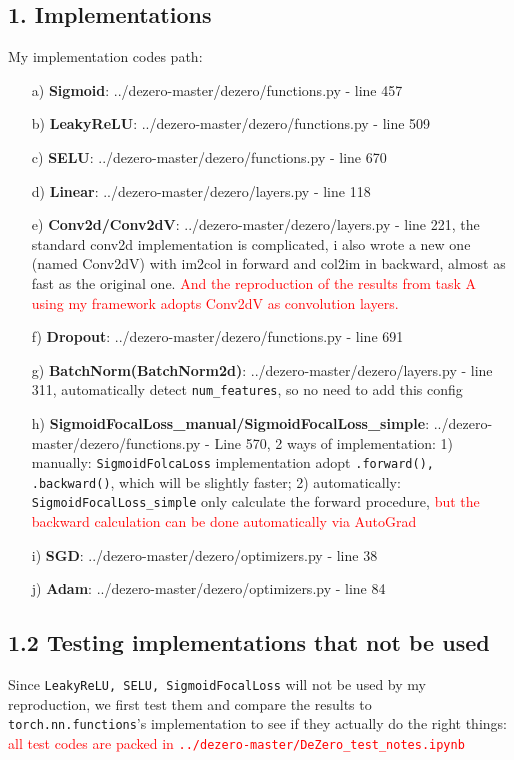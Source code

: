 \documentclass{article}
\newcommand{\subs}[1]{\subsection*{#1}}
\begin{document}
\subs{1. Implementations}
\noindent My implementation codes path:\\
\begin{itemize}
  \item[a)] \textbf{Sigmoid}: ../dezero-master/dezero/functions.py - line 457
  \item[b)] \textbf{LeakyReLU}: ../dezero-master/dezero/functions.py - line 509
  \item[c)] \textbf{SELU}: ../dezero-master/dezero/functions.py - line 670
  \item[d)] \textbf{Linear}: ../dezero-master/dezero/layers.py - line 118
  \item[e)] \textbf{Conv2d/Conv2dV}: ../dezero-master/dezero/layers.py - line 221, the standard conv2d implementation is complicated, i also wrote a new one (named Conv2dV) with im2col in forward and col2im in backward, almost as fast as the original one. \textcolor{red}{And the reproduction of the results from task A using my framework adopts Conv2dV as convolution layers.}
  \item[f)] \textbf{Dropout}: ../dezero-master/dezero/functions.py - line 691
  \item[g)] \textbf{BatchNorm(BatchNorm2d)}: ../dezero-master/dezero/layers.py - line 311, automatically detect \texttt{num\_features}, so no need to add this config
  \item[h)] \textbf{SigmoidFocalLoss\_manual/SigmoidFocalLoss\_simple}: ../dezero-master/dezero/functions.py - Line 570, 2 ways of implementation: 
  1) manually: \texttt{SigmoidFolcaLoss} implementation adopt \texttt{.forward(), .backward()}, which will be slightly faster; 2) automatically: \texttt{SigmoidFocalLoss\_simple} only calculate the forward procedure, \textcolor{red}{but the backward calculation can be done automatically via AutoGrad}
  \item[i)] \textbf{SGD}: ../dezero-master/dezero/optimizers.py - line 38
  \item[j)] \textbf{Adam}: ../dezero-master/dezero/optimizers.py - line 84   
\end{itemize}
\vspace{5mm}
\subs{1.2 Testing implementations that not be used}
\noindent Since \texttt{LeakyReLU, SELU, SigmoidFocalLoss} will not be used by my reproduction, we first test them and compare the results to \texttt{torch.nn.functions}'s implementation to see if they actually do the right things:
\textcolor{red}{all test codes are packed in \texttt{../dezero-master/DeZero\_test\_notes.ipynb}}
\end{document}
